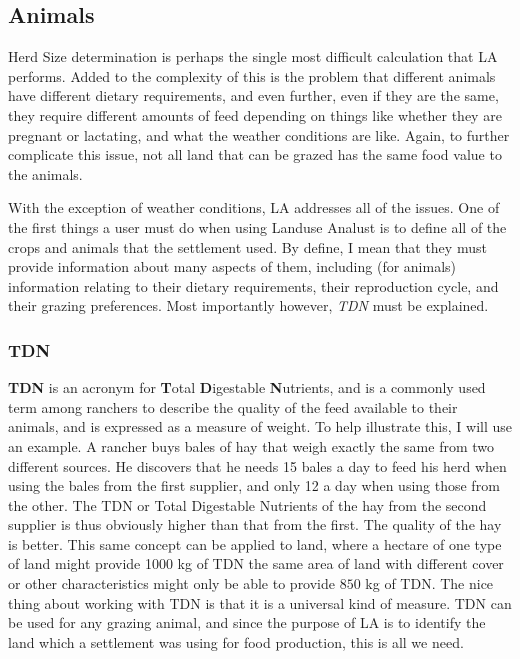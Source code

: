   \subsection{Animals}
  Herd Size determination is perhaps the single most difficult calculation that LA
performs.  Added to the complexity of this is the problem that different animals have different dietary requirements, and even further, even if they are the same, they require different amounts of feed depending on things like whether they are pregnant or lactating, and what the weather conditions are like.  Again, to further complicate this issue, not all land that can be grazed has the same food value to the animals.

  With the exception of weather conditions, LA addresses all of the issues.  One of the first things a user must do when using
Landuse Analust is to define all of the crops and animals that the settlement used.  By define, I mean that they must provide information about many aspects of them, including (for animals) information relating to their dietary requirements, their reproduction cycle, and their grazing preferences.  Most importantly however, \textit{TDN} must be explained.

    \subsubsection{TDN}
      \label{TDN}
    \textbf{TDN} is an acronym for \textbf{T}otal \textbf{D}igestable \textbf{N}utrients, and is a commonly used term among ranchers to describe the quality of the feed available to their animals, and is expressed as a measure of weight.  To help illustrate this, I will use an example.  A rancher buys bales of hay that weigh exactly the same from two different sources.  He discovers that he needs 15 bales a day to feed his herd when using the bales from the first supplier, and only 12 a day when using those from the other.  The TDN or Total Digestable Nutrients of the hay from the second supplier is thus obviously higher than that from the first.  The quality of the hay is better.  This same concept can be applied to land, where a hectare of one type of land might provide 1000 kg of TDN the same area of land with different cover or other characteristics might only be able to provide $850$ kg of TDN.  The nice thing about working with TDN is that it is a universal kind of measure.  TDN can be used for any grazing animal, and since the purpose of LA is to identify the land which a settlement was using for food production, this is all we need.


